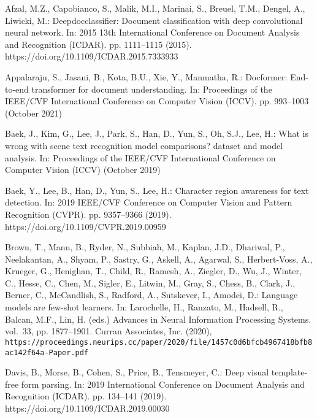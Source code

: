 \documentclass[runningheads]{llncs}
\begin{document}

\begin{thebibliography}{10}
\providecommand{\url}[1]{\texttt{#1}}
\providecommand{\urlprefix}{URL }
\providecommand{\doi}[1]{https://doi.org/#1}

Afzal, M.Z., Capobianco, S., Malik, M.I., Marinai, S., Breuel, T.M., Dengel,
  A., Liwicki, M.: Deepdocclassifier: Document classification with deep
  convolutional neural network. In: 2015 13th International Conference on
  Document Analysis and Recognition (ICDAR). pp. 1111--1115 (2015).
  \doi{10.1109/ICDAR.2015.7333933}

Appalaraju, S., Jasani, B., Kota, B.U., Xie, Y., Manmatha, R.: Docformer:
  End-to-end transformer for document understanding. In: Proceedings of the
  IEEE/CVF International Conference on Computer Vision (ICCV). pp. 993--1003
  (October 2021)

Baek, J., Kim, G., Lee, J., Park, S., Han, D., Yun, S., Oh, S.J., Lee, H.: What
  is wrong with scene text recognition model comparisons? dataset and model
  analysis. In: Proceedings of the IEEE/CVF International Conference on
  Computer Vision (ICCV) (October 2019)

Baek, Y., Lee, B., Han, D., Yun, S., Lee, H.: Character region awareness for
  text detection. In: 2019 IEEE/CVF Conference on Computer Vision and Pattern
  Recognition (CVPR). pp. 9357--9366 (2019). \doi{10.1109/CVPR.2019.00959}

Brown, T., Mann, B., Ryder, N., Subbiah, M., Kaplan, J.D., Dhariwal, P.,
  Neelakantan, A., Shyam, P., Sastry, G., Askell, A., Agarwal, S.,
  Herbert-Voss, A., Krueger, G., Henighan, T., Child, R., Ramesh, A., Ziegler,
  D., Wu, J., Winter, C., Hesse, C., Chen, M., Sigler, E., Litwin, M., Gray,
  S., Chess, B., Clark, J., Berner, C., McCandlish, S., Radford, A., Sutskever,
  I., Amodei, D.: Language models are few-shot learners. In: Larochelle, H.,
  Ranzato, M., Hadsell, R., Balcan, M.F., Lin, H. (eds.) Advances in Neural
  Information Processing Systems. vol.~33, pp. 1877--1901. Curran Associates,
  Inc. (2020),
  \url{https://proceedings.neurips.cc/paper/2020/file/1457c0d6bfcb4967418bfb8ac142f64a-Paper.pdf}

Davis, B., Morse, B., Cohen, S., Price, B., Tensmeyer, C.: Deep visual
  template-free form parsing. In: 2019 International Conference on Document
  Analysis and Recognition (ICDAR). pp. 134--141 (2019).
  \doi{10.1109/ICDAR.2019.00030}


\end{thebibliography}
\end{document}
